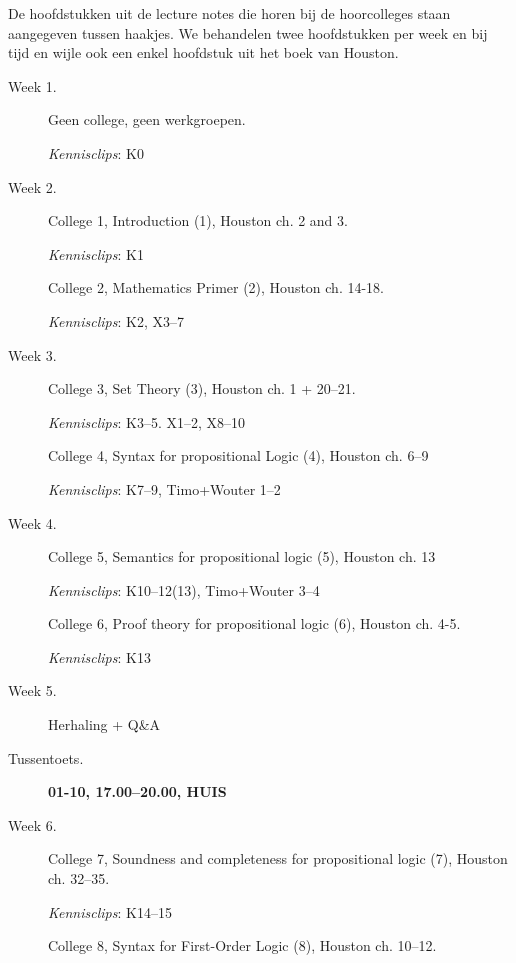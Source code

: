 \documentclass[a4paper,11pt]{article}
\begin{document}
De hoofdstukken uit de lecture notes die horen bij de hoorcolleges staan aangegeven tussen haakjes.
We behandelen twee hoofdstukken per week en bij tijd en wijle ook een enkel hoofdstuk uit het boek van Houston.

\begin{description}

  \item[Week 1.]
    Geen college, geen werkgroepen.

   \emph{Kennisclips}: K0

  \item[Week 2.]
    College 1, Introduction (1), Houston ch. 2 and 3.

   \emph{Kennisclips}: K1

  \item[\phantom{Week 2.}]
    College 2, Mathematics Primer (2), Houston ch. 14-18.

    \emph{Kennisclips}: K2, X3--7

  \item[Week 3.]
    College 3, Set Theory (3), Houston ch. 1 + 20--21.

    \emph{Kennisclips}: K3--5. X1--2, X8--10

  \item[\phantom{Week 2.}]
    College 4, Syntax for propositional Logic (4), Houston ch. 6--9

    \emph{Kennisclips}: K7--9, Timo+Wouter 1--2

  \item[Week 4.]
    College 5, Semantics for propositional logic (5), Houston ch. 13

    \emph{Kennisclips}: K10--12(13), Timo+Wouter 3--4

  \item[\phantom{Week 2.}]
    College 6, Proof theory for propositional logic (6), Houston ch. 4-5.

   \emph{Kennisclips}: K13

  \item[Week 5.]
    Herhaling + Q\&A

  \item[Tussentoets.]
    {\bf  01-10, 17.00--20.00, HUIS}

  \item[Week 6.]
    College 7, Soundness and completeness for propositional logic (7), Houston ch. 32--35.

    \emph{Kennisclips}: K14--15

  \item[\phantom{Week 6}]
    College 8, Syntax for First-Order Logic (8), Houston ch. 10--12.


\end{description}
\end{document}

